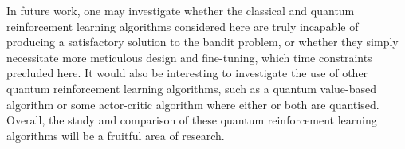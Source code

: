 In future work, one may investigate whether the classical and quantum reinforcement learning algorithms considered here are truly incapable of producing a satisfactory solution to the bandit problem, or whether they simply necessitate more meticulous design and fine-tuning, which time constraints precluded here.
It would also be interesting to investigate the use of other quantum reinforcement learning algorithms, such as a quantum value-based algorithm or some actor-critic algorithm where either or both are quantised.
Overall, the study and comparison of these quantum reinforcement learning algorithms will be a fruitful area of research.
